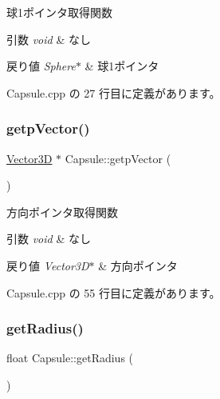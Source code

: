 球1ポインタ取得関数 


\begin{DoxyParams}{引数}
{\em void} & なし \\
\hline
\end{DoxyParams}

\begin{DoxyRetVals}{戻り値}
{\em Sphere$\ast$} & 球1ポインタ \\
\hline
\end{DoxyRetVals}


 Capsule.\+cpp の 27 行目に定義があります。

\mbox{\label{class_capsule_a93bb5298cb7f9f8ab27e08825bcb2f76}} 
\subsubsection{\texorpdfstring{getp\+Vector()}{getpVector()}}
{\footnotesize\ttfamily \mbox{\hyperlink{class_vector3_d}{Vector3D}} $\ast$ Capsule\+::getp\+Vector (\begin{DoxyParamCaption}{ }\end{DoxyParamCaption})}



方向ポインタ取得関数 


\begin{DoxyParams}{引数}
{\em void} & なし \\
\hline
\end{DoxyParams}

\begin{DoxyRetVals}{戻り値}
{\em Vector3\+D$\ast$} & 方向ポインタ \\
\hline
\end{DoxyRetVals}


 Capsule.\+cpp の 55 行目に定義があります。

\mbox{\label{class_capsule_a4e98e8545ea57fe682c5a2002bd49bdb}} 
\subsubsection{\texorpdfstring{get\+Radius()}{getRadius()}}
{\footnotesize\ttfamily float Capsule\+::get\+Radius (\begin{DoxyParamCaption}{ }\end{DoxyParamCaption})}



